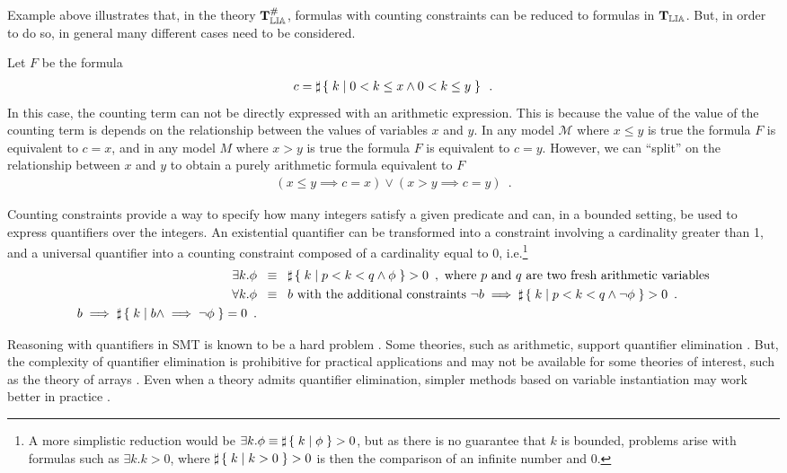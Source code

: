 Example above illustrates that, in the theory $\operatorname{\mathbf{T}^\#_{\mathbb{LIA}}}$, formulas with
counting constraints can be reduced to formulas in $\operatorname{\mathbf{T}_{\mathbb{LIA}}}$. But, in
order to do so, in general many different cases need to be considered.

\begin{example}
\label{ex:disjunction}
Let  $F$ be the formula
\begin{align*}
  c = \sharp\left\lbrace\;k\;|\;0 < k \le x \land 0 < k \le y\;\right\rbrace\enspace.
\end{align*}
In this case, the counting term can not be directly expressed with an
arithmetic expression. This is because the value of the value of the
counting term is depends on the relationship between the values of
variables $x$ and $y$. In any model $\mathcal{M}$ where $x \le y$ is
true the formula $F$ is equivalent to $c = x$, and in any model $M$
where $x > y$ is true the formula $F$ is equivalent to $c = y$.
However, we can ``split'' on the relationship between $x$ and $y$ to
obtain a purely arithmetic formula equivalent to $F$
\begin{align*}
  (x \le y \implies c = x) \lor (x > y \implies c = y)\enspace.
\end{align*}
\end{example}

Counting constraints provide a way to specify how many integers
satisfy a given predicate and can, in a bounded setting, be used to
express quantifiers over the integers. An existential quantifier can
be transformed into a constraint involving a cardinality greater than
1, and a universal quantifier into a counting constraint composed of a
cardinality equal to 0, i.e.\footnote{A more simplistic reduction would be
  $\exists k . \phi \equiv \sharp\left\lbrace\;k\;|\;\phi\;\right\rbrace > 0$, but as there is no guarantee that $k$ is bounded, problems arise with formulas such as $\exists k . k > 0$, where $\sharp\left\lbrace\;k\;|\;k>0\;\right\rbrace > 0$ is then the comparison of an infinite number and 0.}
\begin{align*}
  \exists k . \phi &\;\;\equiv\;\; \sharp\left\lbrace\;k\;|\;p < k < q \land \phi\;\right\rbrace > 0 \enspace, \text{\ where $p$ and $q$ are two fresh arithmetic variables}\\
  \forall k . \phi &\;\;\equiv\;\; b \text{\ with the additional constraints\ } \lnot b \implies \sharp\left\lbrace\;k\;|\;p < k < q \land \lnot \phi\;\right\rbrace > 0 \enspace. \\
  b \implies \sharp\left\lbrace\;k\;|\;b \land \implies \lnot \phi\;\right\rbrace = 0 \enspace. \\
\end{align*}

Reasoning with quantifiers in SMT is known to be a hard problem
\cite{ge2010solving,weispfenning1988complexity}. Some theories, such
as arithmetic, support quantifier elimination \cite{cooper}. But, the
complexity of quantifier elimination is prohibitive for practical
applications and may not be available for some theories of interest,
such as the theory of arrays \cite{bradley2006s}. Even when a theory
admits quantifier elimination,  simpler methods based on variable
instantiation may work better in practice \cite{dutertre2015solving}.

